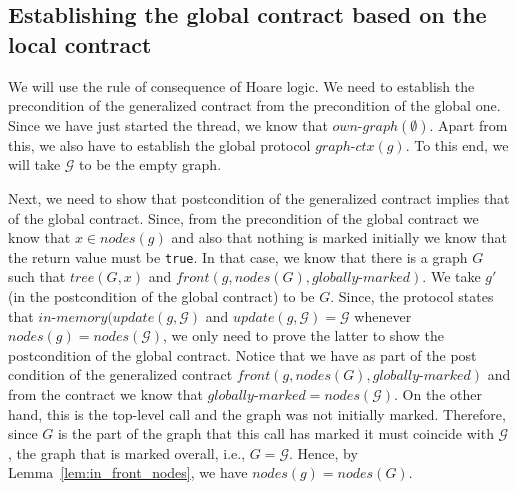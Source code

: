 \documentclass[]{scrartcl}
\def\MyMLe{\lstinline[language=MyML, basicstyle=\small\ttfamily, mathescape=true]}
\newcommand{\nodes}{\mathit{nodes}}
\newcommand{\front}{\mathit{front}}
\newcommand{\inmem}{\mathit{in\text{-}memory}}
\newcommand{\localgr}{\mathit{own\text{-}graph}}
\newcommand{\globprot}{\mathit{graph\text{-}ctx}}
\newcommand{\globmark}{\mathit{globally\text{-}marked}}
\newcommand{\tree}{\mathit{tree}}
\begin{document}
\subsection{Establishing the global contract based on the local contract}
We will use the rule of consequence of Hoare logic.
We need to establish the precondition of the generalized contract
from the precondition of the global one.
Since we have just started the thread, we know that
$\localgr(\emptyset)$.
Apart from this, we also have to establish the global protocol $\globprot(g)$. To this end, we will take $\mathcal{G}$
to be the empty graph.

Next, we need to show that postcondition of the generalized contract
implies that of the global contract.
Since, from the precondition of the global contract we know that
$x \in \nodes(g)$ and also that nothing is marked initially we know that
the return value must be \MyMLe{true}.
In that case, we know that there is a graph $G$ such that
$\tree(G, x)$ and $\front(g, \nodes(G), \globmark)$.
We take $g'$ (in the postcondition of the global contract)
to be $G$. Since, the protocol states that
$\inmem(\mathit{update}(g, \mathcal{G})$ and
$\mathit{update}(g, \mathcal{G}) = \mathcal{G}$ whenever $\nodes(g) = \nodes(\mathcal{G})$,
we only need to prove the latter to show the postcondition of
the global contract.
Notice that we have as part of the post condition of the generalized contract $\front(g, \nodes(G), \globmark)$ and
from the contract we know that $\globmark = \nodes(\mathcal{G})$.
On the other hand, this is the top-level call and the graph was not initially marked.
Therefore, since $G$ is the part of the graph 
that this call has marked it must coincide with $\mathcal{G}$,
the graph that is marked overall, i.e., $G = \mathcal{G}$.
Hence, by Lemma~\ref{lem:in_front_nodes}, we have
$\nodes(g) = \nodes(G)$.
\end{document}
